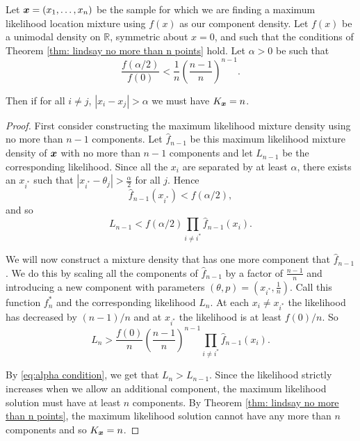 		
		\begin{theorem}
			Let ${\bm{{x}}} = (x_1, \dots, x_n)$ be the sample for which we are finding a maximum likelihood location mixture using $f(x)$ as our component density. Let $f(x)$ be a unimodal density on $\mathbb{R}$, symmetric about $x = 0$, and such that the conditions of Theorem \ref{thm: lindsay no more than n points} hold. Let $\alpha > 0$ be such that
			\begin{equation}
				\frac{f(\alpha/2)}{f(0)} < \frac{1}{n}\left(\frac{n-1}{n}\right)^{n-1}.
				\label{eq:alpha condition}
			\end{equation}
			

			Then if for all $i\neq j$, $|x_i - x_j| > \alpha$ we must have $K_{\bm{{x}}} = n$.
		\end{theorem}
		\begin{proof}
			First consider constructing the maximum likelihood mixture density using no more than $n-1$ components. Let $\hat{f}_{n-1}$ be this maximum likelihood mixture density of ${\bm{{x}}}$ with no more than $n-1$ components and let $L_{n-1}$ be the corresponding likelihood. Since all the $x_i$ are separated by at least $\alpha$, there exists an $x_{i^*}$ such that $|x_{i^*} - \theta_j|>\frac{\alpha}{2}$ for all $j$. Hence
			\begin{equation}
				\hat{f}_{n-1}(x_{i^*}) < f(\alpha/2),
			\end{equation}
			and so
			\begin{equation}
				L_{n-1} < f(\alpha/2) \prod_{i\neq i^*} \hat{f}_{n-1}(x_{i}).	
			\end{equation}
						
			We will now construct a mixture density that has one more component that $\hat{f}_{n-1}$. We do this by scaling all the components of $\hat{f}_{n-1}$ by a factor of $\frac{n-1}{n}$ and introducing a new component with parameters $(\theta, p) = (x_{i^*},\frac{1}{n})$. Call this function $f^*_n$ and the corresponding likelihood $L_n$. At each $x_i \neq x_{i^*}$ the likelihood has decreased by $(n-1)/n$ and at $x_{i^*}$ the likelihood is at least $f(0)/n$. So
			\begin{equation}
				L_n > \frac{f(0)}{n} \left(\frac{n-1}{n}\right)^{n-1}\prod_{i\neq i^*} \hat{f}_{n-1}(x_i).	
			\end{equation}
			
			By \eqref{eq:alpha condition}, we get that $L_n > L_{n-1}$. Since the likelihood strictly increases when we allow an additional component, the maximum likelihood solution must have at least $n$ components. By Theorem \ref{thm: lindsay no more than n points}, the maximum likelihood solution cannot have any more than $n$ components and so $K_{\bm{{x}}} = n$.
		\end{proof}

